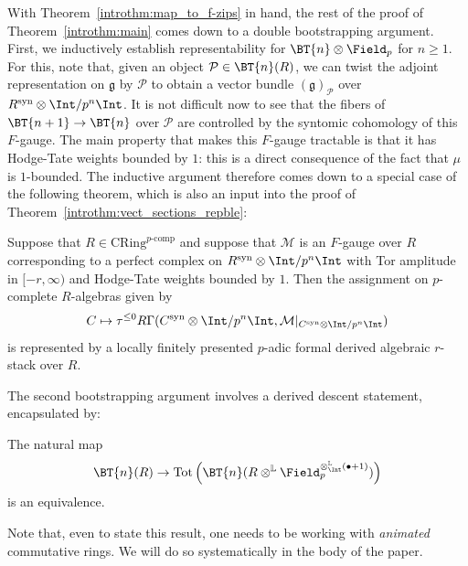 \documentclass[10pt]{amsart}
\begin{document}
With Theorem~\ref{introthm:map_to_f-zips} in hand, the rest of the proof of Theorem~\ref{introthm:main} comes down to a double bootstrapping argument. First, we inductively establish  representability for $\BT{n}\otimes\Field_p$ for $n\ge 1$. For this, note that, given an object $\mathcal{P}\in \BT{n}(R)$, we can twist the adjoint representation on $\mathfrak{g}$ by $\mathcal{P}$ to obtain a vector bundle $(\mathfrak{g})_{\mathcal{P}}$ over $R^{\mathrm{syn}}\otimes\Int/p^n\Int$. It is not difficult now to see that the fibers of $\BT{n+1}\to \BT{n}$ over $\mathcal{P}$ are controlled by the syntomic cohomology of this $F$-gauge. The main property that makes this $F$-gauge tractable is that it has Hodge-Tate weights bounded by $1$: this is a direct consequence of the fact that $\mu$ is $1$-bounded. The inductive argument therefore comes down to a special case of the following theorem, which is also an input into the proof of Theorem~\ref{introthm:vect_sections_repble}:

\begin{introthm}\label{introthm:f_gauges}
Suppose that $R\in \mathrm{CRing}^{p\text{-comp}}$ and suppose that $\mathcal{M}$ is an $F$-gauge over $R$ corresponding to a perfect complex on $R^{\mathrm{syn}}\otimes\Int/p^n\Int$ with Tor amplitude in $[-r,\infty)$ and Hodge-Tate weights bounded by $1$. Then the assignment on $p$-complete $R$-algebras given by
\[
C\mapsto \tau^{\le 0}R\Gamma(C^{\mathrm{syn}}\otimes\Int/p^n\Int,\mathcal{M}\vert_{C^{\mathrm{syn}}\otimes\Int/p^n\Int})
\]
is represented by a locally finitely presented $p$-adic formal derived algebraic $r$-stack over $R$.
\end{introthm}

The second bootstrapping argument involves a derived descent statement, encapsulated by:
\begin{introprop}
\label{introprop:derived_descent}
The natural map
\[
\BT{n}(R) \to \mathrm{Tot}\left(\BT{n}(R\otimes^{\mathbb{L}}\Field_p^{\otimes_{\Int}^{\mathbb{L}}(\bullet + 1)})\right)
\]
is an equivalence.
\end{introprop}
Note that, even to state this result, one needs to be working with \emph{animated} commutative rings. We will do so systematically in the body of the paper.
\end{document}
